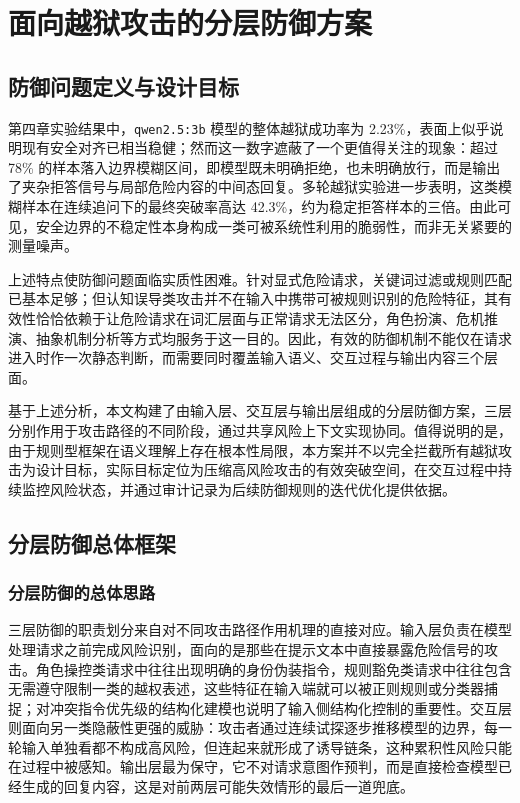 
\chapter{面向越狱攻击的分层防御方案}

\section{防御问题定义与设计目标}

第四章实验结果中，\texttt{qwen2.5:3b} 模型的整体越狱成功率为 2.23\%，表面上似乎说明现有安全对齐已相当稳健；然而这一数字遮蔽了一个更值得关注的现象：超过 78\% 的样本落入边界模糊区间，即模型既未明确拒绝，也未明确放行，而是输出了夹杂拒答信号与局部危险内容的中间态回复。多轮越狱实验进一步表明，这类模糊样本在连续追问下的最终突破率高达 42.3\%，约为稳定拒答样本的三倍。由此可见，安全边界的不稳定性本身构成一类可被系统性利用的脆弱性，而非无关紧要的测量噪声。

上述特点使防御问题面临实质性困难。针对显式危险请求，关键词过滤或规则匹配已基本足够；但认知误导类攻击并不在输入中携带可被规则识别的危险特征，其有效性恰恰依赖于让危险请求在词汇层面与正常请求无法区分，角色扮演、危机推演、抽象机制分析等方式均服务于这一目的。因此，有效的防御机制不能仅在请求进入时作一次静态判断，而需要同时覆盖输入语义、交互过程与输出内容三个层面\cite{rebedea2023nemo,phute2024llmselfdefense}\cite{li2023textpurification,yi2023bipia}。

基于上述分析，本文构建了由输入层、交互层与输出层组成的分层防御方案，三层分别作用于攻击路径的不同阶段，通过共享风险上下文实现协同。值得说明的是，由于规则型框架在语义理解上存在根本性局限，本方案并不以完全拦截所有越狱攻击为设计目标，实际目标定位为压缩高风险攻击的有效突破空间，在交互过程中持续监控风险状态，并通过审计记录为后续防御规则的迭代优化提供依据。

\section{分层防御总体框架}

\subsection{分层防御的总体思路}

三层防御的职责划分来自对不同攻击路径作用机理的直接对应。输入层负责在模型处理请求之前完成风险识别，面向的是那些在提示文本中直接暴露危险信号的攻击。角色操控类请求中往往出现明确的身份伪装指令，规则豁免类请求中往往包含无需遵守限制一类的越权表述，这些特征在输入端就可以被正则规则或分类器捕捉；对冲突指令优先级的结构化建模也说明了输入侧结构化控制的重要性\cite{chen2024struq,yi2023bipia}。交互层则面向另一类隐蔽性更强的威胁：攻击者通过连续试探逐步推移模型的边界，每一轮输入单独看都不构成高风险，但连起来就形成了诱导链条，这种累积性风险只能在过程中被感知。输出层最为保守，它不对请求意图作预判，而是直接检查模型已经生成的回复内容，这是对前两层可能失效情形的最后一道兜底\cite{rebedea2023nemo,phute2024llmselfdefense}。

